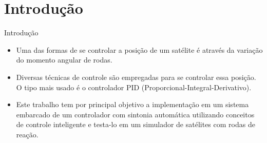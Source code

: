 \documentclass{beamer}
\begin{document}
\section{Introdução}
\begin{frame}{Introdução}
	\begin{itemize}
		\justifying
		\item Uma das formas de se controlar a posição de um satélite é através da variação do momento angular de rodas.
		\item Diversas técnicas de controle são empregadas para se controlar essa posição. O tipo mais usado é o controlador PID  (Proporcional-Integral-Derivativo).
		\item Este trabalho tem por principal objetivo a implementação em um sistema embarcado
de um controlador com sintonia automática utilizando conceitos de controle inteligente e testa-lo em um simulador de satélites com rodas de reação.
    \end{itemize}
\end{frame}

\end{document}
